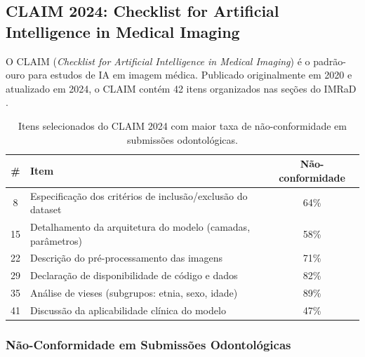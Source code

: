 
\subsection{CLAIM 2024: Checklist for Artificial Intelligence in Medical Imaging}

O CLAIM (\textit{Checklist for Artificial Intelligence in Medical Imaging}) é
o padrão-ouro para estudos de IA em imagem médica. Publicado originalmente em
2020 e atualizado em 2024, o CLAIM contém 42 itens organizados nas seções do
IMRaD \cite{mongan2020claim}.


\begin{table}[H]
  \centering
  \caption{Itens selecionados do CLAIM 2024 com maior taxa de não-conformidade
  em submissões odontológicas.}
  \label{tab:claim-2024}
  \begin{tabularx}{\textwidth}{cXc}
    \toprule
    \textbf{\#} & \textbf{Item} & \textbf{Não-conformidade} \\
    \midrule
    8  & Especificação dos critérios de inclusão/exclusão do dataset & 64\% \\
    15 & Detalhamento da arquitetura do modelo (camadas, parâmetros) & 58\% \\
    22 & Descrição do pré-processamento das imagens & 71\% \\
    29 & Declaração de disponibilidade de código e dados & 82\% \\
    35 & Análise de vieses (subgrupos: etnia, sexo, idade) & 89\% \\
    41 & Discussão da aplicabilidade clínica do modelo & 47\% \\
    \bottomrule
  \end{tabularx}
\end{table}

\subsubsection{Não-Conformidade em Submissões Odontológicas}


